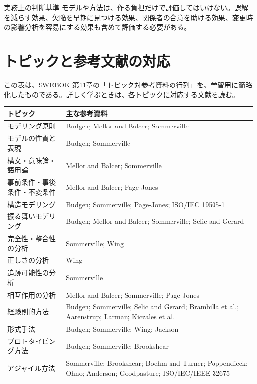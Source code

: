 \documentclass[a4paper,11pt]{ltjsarticle}
\begin{document}
\begin{pointbox}{実務上の判断基準}
モデルや方法は、作る負担だけで評価してはいけない。誤解を減らす効果、欠陥を早期に見つける効果、関係者の合意を助ける効果、変更時の影響分析を容易にする効果も含めて評価する必要がある。
\end{pointbox}

\section{トピックと参考文献の対応}
この表は、SWEBOK 第11章の「トピック対参考資料の行列」を、学習用に簡略化したものである。詳しく学ぶときは、各トピックに対応する文献を読む。

\begin{longtable}{>{\raggedright\arraybackslash}p{}>{\raggedright\arraybackslash}p{}}
\toprule
\textbf{トピック} & \textbf{主な参考資料} \\
\midrule
モデリング原則 & Budgen; Mellor and Balcer; Sommerville \\
モデルの性質と表現 & Budgen; Sommerville \\
構文・意味論・語用論 & Mellor and Balcer; Sommerville \\
事前条件・事後条件・不変条件 & Mellor and Balcer; Page-Jones \\
構造モデリング & Budgen; Sommerville; Page-Jones; ISO/IEC 19505-1 \\
振る舞いモデリング & Budgen; Mellor and Balcer; Sommerville; Selic and Gerard \\
完全性・整合性の分析 & Sommerville; Wing \\
正しさの分析 & Wing \\
追跡可能性の分析 & Sommerville \\
相互作用の分析 & Mellor and Balcer; Sommerville; Page-Jones \\
経験則的方法 & Budgen; Sommerville; Selic and Gerard; Brambilla et al.; Aarenstrup; Larman; Kiczales et al. \\
形式手法 & Budgen; Sommerville; Wing; Jackson \\
プロトタイピング方法 & Budgen; Sommerville; Brookshear \\
アジャイル方法 & Sommerville; Brookshear; Boehm and Turner; Poppendieck; Ohno; Anderson; Goodpasture; ISO/IEC/IEEE 32675 \\
\bottomrule
\end{longtable}
\end{document}
